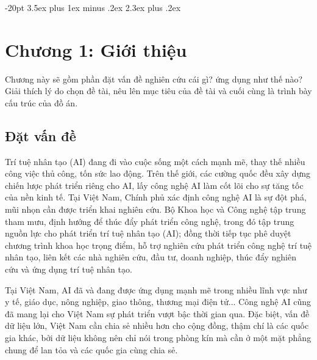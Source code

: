 \documentclass[14pt,oneside,a4paper]{extreport}
\begin{document}

\pagebreak


\pagebreak


\pagebreak

\normalsize
\tableofcontents{}

\large
\makeatletter
\renewcommand\thesection{}
\renewcommand\thesubsection{\arabic{section}.\arabic{subsection}.}
\renewcommand\thesubsubsection{\thesubsection\arabic{subsubsection}.}
\makeatother

\titlespacing{\section}
{-20pt}%
{3.5ex plus 1ex minus .2ex}%
{2.3ex plus .2ex}%

\section{Chương 1: Giới thiệu}
Chương này sẽ gồm phần đặt vấn đề nghiên cứu cái gì? ứng dụng như thế nào? Giải thích lý do chọn đề tài, nêu lên mục tiêu của đề tài và cuối cùng là trình bày cấu trúc của đồ án.
\subsection{Đặt vấn đề}
Trí tuệ nhân tạo (AI) đang đi vào cuộc sống một cách mạnh mẽ, thay thế nhiều công việc thủ công, tốn sức lao động. Trên thế giới, các cường quốc đều xây dựng chiến lược phát triển riêng cho AI, lấy công nghệ AI làm cốt lõi cho sự tăng tốc của nền kinh tế. Tại Việt Nam, Chính phủ xác định công nghệ AI là sự đột phá, mũi nhọn cần được triển khai nghiên cứu. Bộ Khoa học và Công nghệ tập trung tham mưu, định hướng để thúc đẩy phát triển công nghệ, trong đó tập trung nguồn lực cho phát triển trí tuệ nhân tạo (AI); đồng thời tiếp tục phê duyệt chương trình khoa học trọng điểm, hỗ trợ nghiên cứu phát triển công nghệ trí tuệ nhân tạo, liên kết các nhà nghiên cứu, đầu tư, doanh nghiệp, thúc đẩy nghiên cứu và ứng dụng trí tuệ nhân tạo.

Tại Việt Nam, AI đã và đang được ứng dụng mạnh mẽ trong nhiều lĩnh vực như y tế, giáo dục, nông nghiệp, giao thông, thương mại điện tử... Công nghệ AI cũng đã mang lại cho Việt Nam sự phát triển vượt bậc thời gian qua. Đặc biệt, vấn đề dữ liệu lớn, Việt Nam cần chia sẻ nhiều hơn cho cộng đồng, thậm chí là các quốc gia khác, bởi dữ liệu không nên chỉ nói trong phòng kín mà cần ở một mặt phẳng chung để lan tỏa và các quốc gia cùng chia sẻ.
\end{document}
